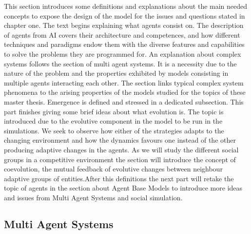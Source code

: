 \documentclass[11pt,oneside,a4paper,openright]{report}
\begin{document}
This section introduces some definitions and explanations about the main needed concepts to expose the design of the model for the issues and questions stated in chapter one. The text begins explaining what agents consist on. The description of agents from AI covers their architecture and competences, and how different techniques and paradigms endow them with the diverse features and capabilities to solve the problems they are programmed for. An explanation about complex systems follows the section of multi agent systems. It is a necessity due to the nature of the problem and the properties exhibited by models consisting in multiple agents interacting each other. The section links typical complex system phenomena to the arising properties of the models studied for the topics of these master thesis. Emergence is defined and stressed in a dedicated subsection. This part finishes giving some brief ideas about what evolution is. The topic is introduced due to the evolutive component in the model to be run in the simulations. We seek to observe how either of the strategies adapts to the changing environment and how the dynamics favours one instead of the other producing adaptive changes in the agents. As we will study the different social groups in a competitive environment the section will introduce the concept of coevolution, the mutual feedback of evolutive changes between neighbour adaptive groups of entities.After this definitions the next part will retake the topic of agents in the section about Agent Base Models to introduce more ideas and issues from Multi Agent Systems and social simulation.   


\subsection{Multi Agent Systems} %


\end{document}
